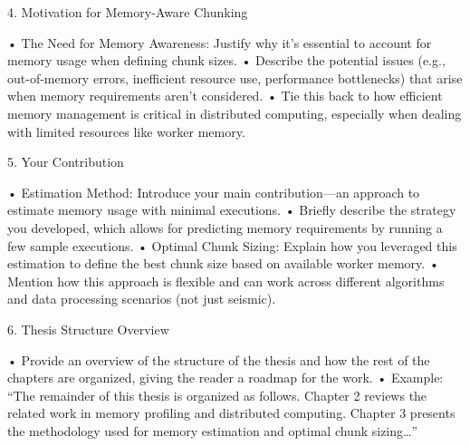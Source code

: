 4. Motivation for Memory-Aware Chunking

	•	The Need for Memory Awareness: Justify why it’s essential to account for memory usage when defining chunk sizes.
	•	Describe the potential issues (e.g., out-of-memory errors, inefficient resource use, performance bottlenecks) that arise when memory requirements aren’t considered.
	•	Tie this back to how efficient memory management is critical in distributed computing, especially when dealing with limited resources like worker memory.

5. Your Contribution

	•	Estimation Method: Introduce your main contribution—an approach to estimate memory usage with minimal executions.
	•	Briefly describe the strategy you developed, which allows for predicting memory requirements by running a few sample executions.
	•	Optimal Chunk Sizing: Explain how you leveraged this estimation to define the best chunk size based on available worker memory.
	•	Mention how this approach is flexible and can work across different algorithms and data processing scenarios (not just seismic).

6. Thesis Structure Overview

	•	Provide an overview of the structure of the thesis and how the rest of the chapters are organized, giving the reader a roadmap for the work.
	•	Example: “The remainder of this thesis is organized as follows. Chapter 2 reviews the related work in memory profiling and distributed computing. Chapter 3 presents the methodology used for memory estimation and optimal chunk sizing…”
